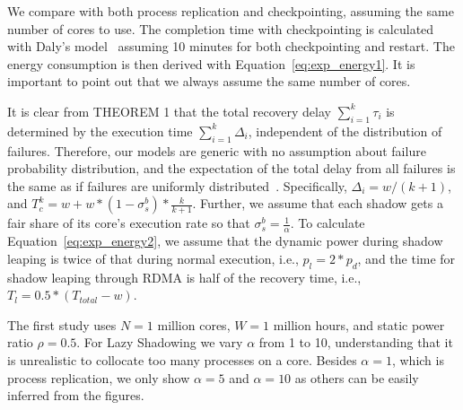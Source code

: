 We compare with both process replication and checkpointing, assuming the same number of cores to use. The completion time with checkpointing is calculated with Daly's model~\cite{daly_fgcs_2006} assuming 10 minutes for both checkpointing and restart. The energy consumption is then derived with Equation~\ref{eq:exp_energy1}. It is important to point out that we always assume the same number of cores. 


It is clear from THEOREM 1 that the total recovery delay $\sum_{i=1}^k\tau_i$ is determined by the execution time $\sum_{i=1}^k\Delta_i$, independent of the distribution of failures. 
Therefore, our models are generic with no assumption about failure probability distribution, and the expectation of the total delay from all failures is the same as if failures are uniformly distributed~\cite{daly_fgcs_2006}. Specifically, $\Delta_i = w/(k+1)$, and $T_c^k = w + w*(1-\sigma_s^b)*\frac{k}{k+1}$. Further, we assume that each shadow gets a fair share of its core's execution rate so that $\sigma_s^b = \frac{1}{\alpha}$. %
To calculate Equation~\ref{eq:exp_energy2}, we assume that the dynamic power during shadow leaping is twice of that during normal execution, i.e., $p_{l}=2*p_d$, and the time for shadow leaping through RDMA is half of the recovery time, i.e., $T_l=0.5*(T_{total} - w)$. %

The first study uses $N=1$ million cores, %
$W=1$ million hours, and static power ratio $\rho=0.5$.
For Lazy Shadowing we vary $\alpha$ from 1 to 10, understanding that it is unrealistic to collocate too many processes on a core. Besides $\alpha=1$, which is process replication, we only show $\alpha=5$ and $\alpha=10$ as others can be easily inferred from the figures.

